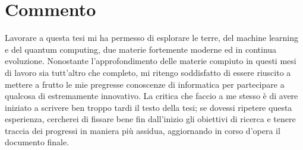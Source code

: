 \section{Commento}

Lavorare a questa tesi mi ha permesso di esplorare le terre, 
del machine learning e del quantum computing, due materie 
fortemente moderne ed in continua evoluzione. 
Nonostante l'approfondimento delle materie compiuto in 
questi mesi di lavoro sia tutt'altro che completo, 
mi ritengo soddisfatto di essere riuscito a mettere a frutto 
le mie pregresse conoscenze di informatica per partecipare a 
qualcosa di estremamente innovativo. La critica che faccio a 
me stesso è di avere iniziato a scrivere ben troppo tardi il 
testo della tesi; se dovessi ripetere questa esperienza, 
cercherei di fissare bene fin dall'inizio gli obiettivi di 
ricerca e tenere traccia dei progressi in maniera più assidua, 
aggiornando in corso d'opera il documento finale. 